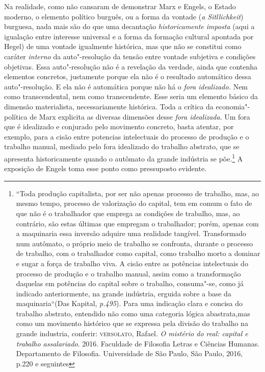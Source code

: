 Na realidade, como não cansaram de demonstrar Marx e Engels, o Estado
moderno, o elemento político burguês, ou a forma da vontade (\emph{a
Sitllichkeit}) burguesa, nada mais são do que uma decantação
\emph{historicamente imposta} (aqui a igualação entre interesse
universal e a forma da formação cultural apontada por Hegel) de uma
vontade igualmente histórica, mas que não se constitui como caráter
\emph{interno} da auto"-resolução da tensão entre vontade subjetiva e
condições objetivas. Essa auto"-resolução não é a revelação da verdade,
ainda que contenha elementos concretos, justamente porque ela não é o
resultado automático dessa auto"-resolução. E ela não é automática
porque não há o \emph{fora idealizado.} Nem como transcendental, nem
como transcendente. Esse seria um elemento básico da dimensão
materialista, necessariamente histórica. Toda a crítica da
economia"-política de Marx explicita as diversas dimensões desse
\emph{fora idealizada}. Um fora que é idealizado e conjurado pelo
movimento concreto, basta atentar, por exemplo, para a cisão entre
potencias intelectuais do processo de produção e o trabalho manual,
mediado pelo fora idealizado do trabalho abstrato, que se apresenta
historicamente quando o autômato da grande indústria se põe.\footnote{``Toda
  produção capitalista, por ser não apenas processo de trabalho, mas, ao
  mesmo tempo, processo de valorização do capital, tem em comum o fato
  de que não é o trabalhador que emprega as condições de trabalho, mas,
  ao contrário, são estas últimas que empregam o trabalhador; porém,
  apenas com a maquinaria essa inversão adquire uma realidade tangível.
  Transformado num autômato, o próprio meio de trabalho se confronta,
  durante o processo de trabalho, com o trabalhador como capital, como
  trabalho morto a dominar e sugar a força de trabalho viva. A cisão
  entre as potências intelectuais do processo de produção e o trabalho
  manual, assim como a transformação daquelas em potências do capital
  sobre o trabalho, consuma"-se, como já indicado anteriormente, na
  grande indústria, erguida sobre a base da maquinaria``(Das Kapital,
  \emph{p.495}). Para uma indicação clara e concisa do trabalho
  abstrato, entendido não como uma categoria lógica abastrata,mas como
  um movimento histórico que se expressa pela divisão do trabalho na
  grande industria, conferir: \textsc{versolato}, Rafael. \emph{O
  mistério do real: capital e trabalho assalariado}. 2016. Faculdade de
  Filosofia Letras e Ciências Humanas. Departamento de Filosofia.
  Universidade de São Paulo, São Paulo, 2016, p.220 e seguintes} A
exposição de Engels toma esse ponto como pressuposto evidente.

